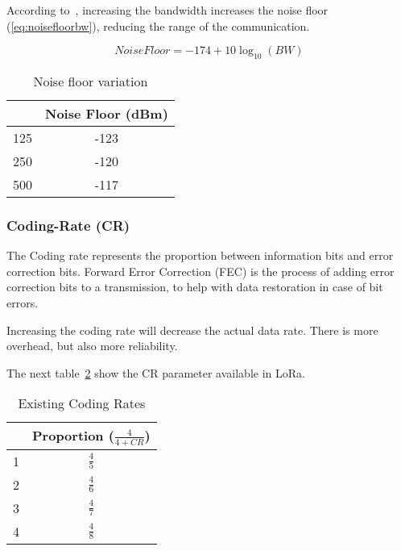 According to~\cite{semtech:modulationbasics}, increasing the
bandwidth increases the noise floor (\ref{eq:noisefloorbw}), reducing the
range of the communication.

\begin{equation}
 \label{eq:noisefloorbw} 
  Noise Floor = -174 + 10 \log_{10}(BW)
\end{equation}


\begin{table}[h!]
\centering
\begin{tabular}{|c|c|}
\hline
\rowcolor[HTML]{C0C0C0} 
\multicolumn{1}{|c|}{\cellcolor[HTML]{C0C0C0}Bandwidth(kHz)} & Noise Floor (dBm) \\ \hline
125                                                          & -123              \\ \hline
250                                                          & -120              \\ \hline
500                                                          & -117              \\ \hline
\end{tabular}
\caption{Noise floor variation\label{table:bw}}
\end{table}


\subsubsection{Coding-Rate (CR)}

The Coding rate represents the proportion between information bits and error
correction bits. 
Forward Error Correction (FEC) is the process of adding error correction bits to a
transmission, to help with data restoration in case of bit errors.

Increasing the coding rate will decrease the actual data rate. 
There is more overhead, but also more reliability.

The next table~\ref{table:cr} show the CR parameter available in LoRa.

\begin{table}[h!]
\centering
\begin{tabular}{|c|c|}
\hline
\rowcolor[HTML]{C0C0C0} 
  \multicolumn{1}{|c|}{\cellcolor[HTML]{C0C0C0}CR} & Proportion ($\frac{4}{4 + CR}$) \\ \hline
1                                                & $\frac{4}{5}$\\ \hline
2                                                & $\frac{4}{6}$\\ \hline
3                                                & $\frac{4}{7}$\\ \hline
4                                                & $\frac{4}{8}$\\ \hline
\end{tabular}
  \caption{Existing Coding Rates\label{table:cr}}
\end{table}


